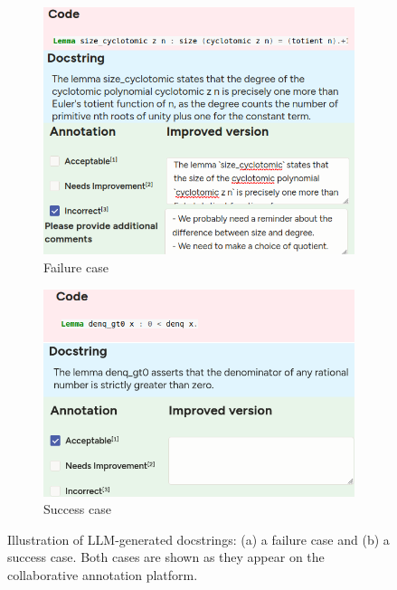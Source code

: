 \documentclass[11pt,a4paper]{article}
\begin{document}
\begin{figure}[h]
  \centering
  \begin{subfigure}[t]{0.45\textwidth}
    \centering
    \includegraphics[width=\linewidth]{fail.png}
    \caption{Failure case}
    \label{fig:fail-case}
  \end{subfigure}%
  \hfill
  \begin{subfigure}[t]{0.45\textwidth}
    \centering
    \includegraphics[width=\linewidth]{success.png}
    \caption{Success case}
    \label{fig:success-case}
  \end{subfigure}
  \caption{Illustration of LLM-generated docstrings: (a) a failure case and (b) a success case. Both cases are shown as they appear on the collaborative annotation platform.}
  \label{fig:llm-examples}
\end{figure}
\end{document}
